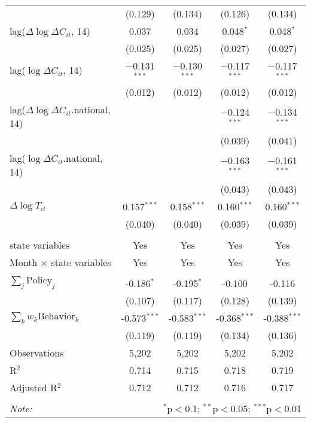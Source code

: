 \begin{tabular}{@{\extracolsep{1pt}}lcccc}
  & (0.129) & (0.134) & (0.126) & (0.134) \\ 
  lag($\Delta \log \Delta C_{it}$, 14) & 0.037 & 0.034 & 0.048$^{*}$ & 0.048$^{*}$ \\ 
  & (0.025) & (0.025) & (0.027) & (0.027) \\ 
  lag($\log \Delta C_{it}$, 14) & $-$0.131$^{***}$ & $-$0.130$^{***}$ & $-$0.117$^{***}$ & $-$0.117$^{***}$ \\ 
  & (0.012) & (0.012) & (0.012) & (0.012) \\ 
  lag($\Delta \log \Delta C_{it}$.national, 14) &  &  & $-$0.124$^{***}$ & $-$0.134$^{***}$ \\ 
  &  &  & (0.039) & (0.041) \\ 
  lag($\log \Delta C_{it}$.national, 14) &  &  & $-$0.163$^{***}$ & $-$0.161$^{***}$ \\ 
  &  &  & (0.043) & (0.043) \\ 
  $\Delta \log T_{it}$ & 0.157$^{***}$ & 0.158$^{***}$ & 0.160$^{***}$ & 0.160$^{***}$ \\ 
  & (0.040) & (0.040) & (0.039) & (0.039) \\ 
 \hline \\[-1.8ex] 
state variables & Yes & Yes & Yes & Yes \\ 
Month $\times$ state variables & Yes & Yes & Yes & Yes \\ 
\hline \\[-1.8ex] 
$\sum_j \mathrm{Policy}_j$ & -0.186$^{*}$ & -0.195$^{*}$ & -0.100 & -0.116 \\ 
 & (0.107) & (0.117) & (0.128) & (0.139) \\ 
$\sum_k w_k \mathrm{Behavior}_k$ & -0.573$^{***}$ & -0.583$^{***}$ & -0.368$^{***}$ & -0.388$^{***}$ \\ 
 & (0.119) & (0.119) & (0.134) & (0.136) \\ 
Observations & 5,202 & 5,202 & 5,202 & 5,202 \\ 
R$^{2}$ & 0.714 & 0.715 & 0.718 & 0.719 \\ 
Adjusted R$^{2}$ & 0.712 & 0.712 & 0.716 & 0.717 \\ 
\hline 
\hline \\[-1.8ex] 
\textit{Note:}  & \multicolumn{4}{r}{$^{*}$p$<$0.1; $^{**}$p$<$0.05; $^{***}$p$<$0.01} \\ 
\end{tabular} 